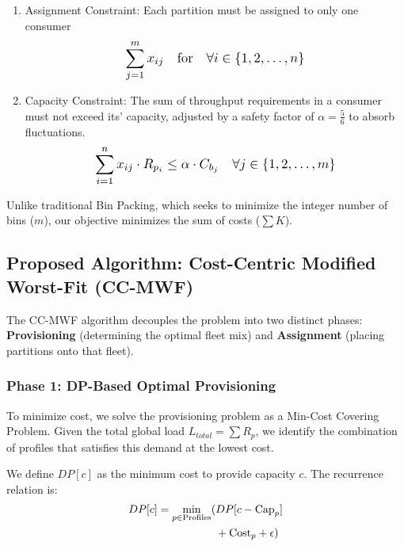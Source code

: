﻿\documentclass[conference]{IEEEtran}
\begin{document}
\begin{enumerate}
    \item Assignment Constraint: Each partition must be assigned to only one consumer
    \begin{equation}
        \scalebox{1.2}{$ \displaystyle \sum_{j=1}^{m} x_{ij} \quad \text{for} \quad \forall i \in \{1, 2, \dots, n\} $}
    \end{equation}
    \item Capacity Constraint: The sum of throughput requirements in a consumer must not exceed its' capacity, adjusted by a safety factor of $\alpha = \frac{5}{6}$ to absorb fluctuations.
    \begin{equation}
        \scalebox{1.2}{$ \displaystyle \sum_{i=1}^{n} x_{ij} \cdot R_{p_i} \le \alpha \cdot C_{b_j} \quad \forall j \in \{1, 2, \dots, m\} $}
    \end{equation}
\end{enumerate}

Unlike traditional Bin Packing, which seeks to minimize the integer number of bins ($m$), our objective minimizes the sum of costs ($\sum K$).

\subsection{Proposed Algorithm: Cost-Centric Modified Worst-Fit (CC-MWF)}

The CC-MWF algorithm decouples the problem into two distinct phases: \textbf{Provisioning} (determining the optimal fleet mix) and \textbf{Assignment} (placing partitions onto that fleet).

\subsubsection{Phase 1: DP-Based Optimal Provisioning}
To minimize cost, we solve the provisioning problem as a Min-Cost Covering Problem. Given the total global load $L_{total} = \sum R_p$, we identify the combination of profiles that satisfies this demand at the lowest cost. 

We define $DP[c]$ as the minimum cost to provide capacity $c$. The recurrence relation is:
\begin{equation}
\scalebox{1.0}{ %
$ \begin{aligned}
DP[c] = \min_{p \in \text{Profiles}} (&DP[c - \text{Cap}_p] \\
&+ \text{Cost}_p + \epsilon)
\end{aligned} $
}
\end{equation}
\end{document}
